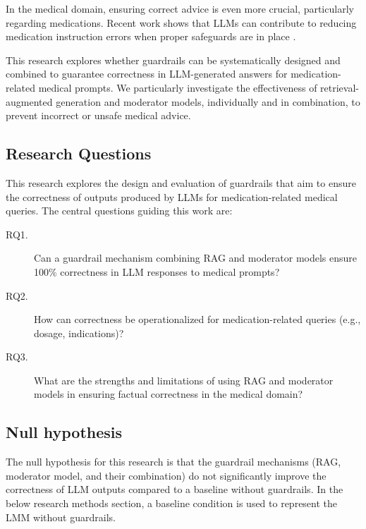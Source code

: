 In the medical domain, ensuring correct advice is even more crucial, particularly regarding medications.
Recent work shows that LLMs can contribute to reducing medication instruction errors when proper safeguards are in place \citep{pais2024medication}.

This research explores whether guardrails can be systematically designed and combined to guarantee correctness in LLM-generated answers for medication-related medical prompts.
We particularly investigate the effectiveness of retrieval-augmented generation and moderator models, individually and in combination, to prevent incorrect or unsafe medical advice.

\subsection{Research Questions}
This research explores the design and evaluation of guardrails that aim to ensure the correctness of outputs produced by LLMs for medication-related medical queries.
The central questions guiding this work are:

\begin{description}
    \item[RQ1.] Can a guardrail mechanism combining RAG and moderator models ensure 100\% correctness in LLM responses to medical prompts?
    \item[RQ2.] How can correctness be operationalized for medication-related queries (e.g., dosage, indications)?
    \item[RQ3.] What are the strengths and limitations of using RAG and moderator models in ensuring factual correctness in the medical domain?
\end{description}

\subsection{Null hypothesis}
The null hypothesis for this research is that the guardrail mechanisms (RAG, moderator model, and their combination)
do not significantly improve the correctness of LLM outputs compared to a baseline without guardrails.
In the below research methods section, a baseline condition is used to represent the LMM without guardrails.
